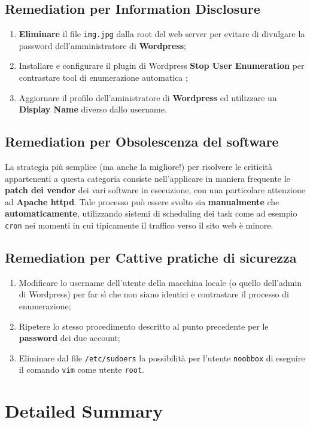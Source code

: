 \documentclass[a4paper, 12pt, oneside]{article}
\begin{document}
\subsection{Remediation per \textbf{Information Disclosure}}
\begin{enumerate}
    \item \textbf{Eliminare} il file \texttt{img.jpg} dalla root del web server per evitare di divulgare la password dell'amministratore di \textbf{Wordpress};
    \item Installare e configurare il plugin di Wordpress \textbf{Stop User Enumeration} per contrastare tool di enumerazione automatica \cite{sue};
    \item Aggiornare il profilo dell'aministratore di \textbf{Wordpress} ed utilizzare un \textbf{Display Name} diverso dallo username.
\end{enumerate}

\subsection{Remediation per \textbf{Obsolescenza del software}}
La strategia più semplice (ma anche la migliore!) per risolvere le criticità appartenenti a questa categoria consiste nell'applicare in maniera frequente le \textbf{patch dei vendor} dei vari software in esecuzione, con una particolare attenzione ad \textbf{Apache httpd}. Tale processo può essere svolto sia \textbf{manualmente} che \textbf{automaticamente}, utilizzando sistemi di scheduling dei task come ad esempio \texttt{cron} nei momenti in cui tipicamente il traffico verso il sito web è minore.

\newpage
\subsection{Remediation per \textbf{Cattive pratiche di sicurezza}}
\begin{enumerate}
    \item Modificare lo username dell'utente della macchina locale (o quello dell'admin di Wordpress) per far sì che non siano identici e contrastare il processo di enumerazione;
    \item Ripetere lo stesso procedimento descritto al punto precedente per le \textbf{password} dei due account;
    \item Eliminare dal file \texttt{/etc/sudoers} la possibilità per l'utente \texttt{noobbox} di eseguire il comando \texttt{vim} come utente \texttt{root}.
\end{enumerate}
\newpage

\section{Detailed Summary}
\newpage

\printbibliography[title={Riferimenti bibliografici}]
\end{document}
